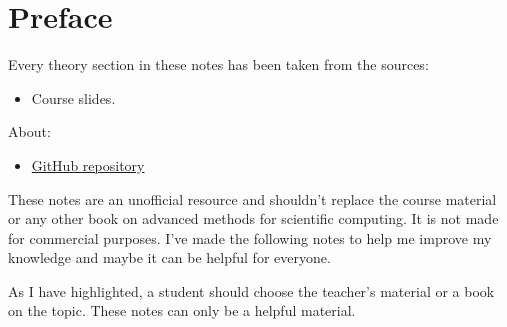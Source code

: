\section*{Preface}

Every theory section in these notes has been taken from the sources:
\begin{itemize}
    \item Course slides.\cite{advanced-methods-for-scientific-computing-polimi}
\end{itemize}
About:
\begin{itemize}
    \item[\faIcon{github}] \href{https://github.com/PoliMI-HPC-E-notes-projects-AndreVale69/HPC-E-PoliMI-university-notes}{GitHub repository}
\end{itemize}
These notes are an unofficial resource and shouldn't replace the course material or any other book on advanced methods for scientific computing. It is not made for commercial purposes. I've made the following notes to help me improve my knowledge and maybe it can be helpful for everyone.

As I have highlighted, a student should choose the teacher's material or a book on the topic. These notes can only be a helpful material.